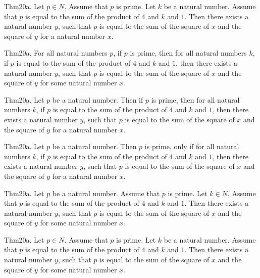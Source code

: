 \documentclass{article}
\begin{document}
Thm20a. Let $p \in N$. Assume that $p$ is prime. Let $k$ be a natural number. Assume that $p$ is equal to the sum of the product of $4$ and $k$ and $1$. Then there exists a natural number $y$, such that $p$ is equal to the sum of the square of $x$ and the square of $y$ for a natural number $x$.

Thm20a. For all natural numbers $p$, if $p$ is prime, then for all natural numbers $k$, if $p$ is equal to the sum of the product of $4$ and $k$ and $1$, then there exists a natural number $y$, such that $p$ is equal to the sum of the square of $x$ and the square of $y$ for some natural number $x$.

Thm20a. Let $p$ be a natural number. Then if $p$ is prime, then for all natural numbers $k$, if $p$ is equal to the sum of the product of $4$ and $k$ and $1$, then there exists a natural number $y$, such that $p$ is equal to the sum of the square of $x$ and the square of $y$ for a natural number $x$.

Thm20a. Let $p$ be a natural number. Then $p$ is prime, only if for all natural numbers $k$, if $p$ is equal to the sum of the product of $4$ and $k$ and $1$, then there exists a natural number $y$, such that $p$ is equal to the sum of the square of $x$ and the square of $y$ for a natural number $x$.

Thm20a. Let $p$ be a natural number. Assume that $p$ is prime. Let $k \in N$. Assume that $p$ is equal to the sum of the product of $4$ and $k$ and $1$. Then there exists a natural number $y$, such that $p$ is equal to the sum of the square of $x$ and the square of $y$ for some natural number $x$.

Thm20a. Let $p \in N$. Assume that $p$ is prime. Let $k$ be a natural number. Assume that $p$ is equal to the sum of the product of $4$ and $k$ and $1$. Then there exists a natural number $y$, such that $p$ is equal to the sum of the square of $x$ and the square of $y$ for some natural number $x$.
\end{document}

